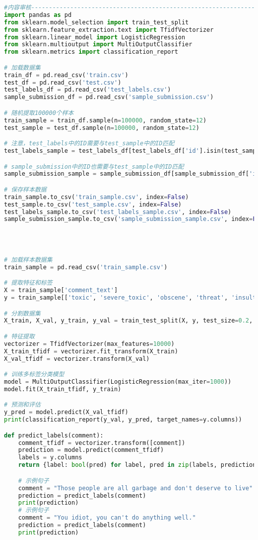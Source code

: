 \documentclass{article}
\begin{document}
\begin{lstlisting}[language=Python]
#内容审核-----------------------------------------------------------------------------
import pandas as pd
from sklearn.model_selection import train_test_split
from sklearn.feature_extraction.text import TfidfVectorizer
from sklearn.linear_model import LogisticRegression
from sklearn.multioutput import MultiOutputClassifier
from sklearn.metrics import classification_report

# 加载数据集
train_df = pd.read_csv('train.csv')
test_df = pd.read_csv('test.csv')
test_labels_df = pd.read_csv('test_labels.csv')
sample_submission_df = pd.read_csv('sample_submission.csv')

# 随机提取100000个样本
train_sample = train_df.sample(n=100000, random_state=12)
test_sample = test_df.sample(n=100000, random_state=12)

# 注意，test_labels中的ID需要与test_sample中的ID匹配
test_labels_sample = test_labels_df[test_labels_df['id'].isin(test_sample['id'])]

# sample_submission中的ID也需要与test_sample中的ID匹配
sample_submission_sample = sample_submission_df[sample_submission_df['id'].isin(test_sample['id'])]

# 保存样本数据
train_sample.to_csv('train_sample.csv', index=False)
test_sample.to_csv('test_sample.csv', index=False)
test_labels_sample.to_csv('test_labels_sample.csv', index=False)
sample_submission_sample.to_csv('sample_submission_sample.csv', index=False)




# 加载样本数据集
train_sample = pd.read_csv('train_sample.csv')

# 提取特征和标签
X = train_sample['comment_text']
y = train_sample[['toxic', 'severe_toxic', 'obscene', 'threat', 'insult', 'identity_hate']]

# 分割数据集
X_train, X_val, y_train, y_val = train_test_split(X, y, test_size=0.2, random_state=42)

# 特征提取
vectorizer = TfidfVectorizer(max_features=10000)
X_train_tfidf = vectorizer.fit_transform(X_train)
X_val_tfidf = vectorizer.transform(X_val)

# 训练多标签分类模型
model = MultiOutputClassifier(LogisticRegression(max_iter=1000))
model.fit(X_train_tfidf, y_train)

# 预测和评估
y_pred = model.predict(X_val_tfidf)
print(classification_report(y_val, y_pred, target_names=y.columns))

def predict_labels(comment):
    comment_tfidf = vectorizer.transform([comment])
    prediction = model.predict(comment_tfidf)
    labels = y.columns
    return {label: bool(pred) for label, pred in zip(labels, prediction[0])}

    # 示例句子
    comment = "Those people are all garbage and don't deserve to live"
    prediction = predict_labels(comment)
    print(prediction)
    # 示例句子
    comment = "You idiot, you can't do anything well."
    prediction = predict_labels(comment)
    print(prediction)
    

\end{lstlisting}
\end{document}
